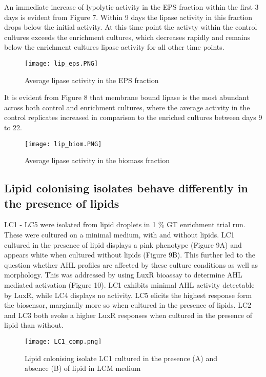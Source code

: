 \documentclass{article}
\begin{document}
An immediate increase of lypolytic activity in the EPS  fraction within the first 3 days is evident from Figure 7. Within 9 days the lipase activity in this fraction drops below the initial activity. At this time point the activty within the control cultures exceeds the enrichment cultures, which decreases rapidly and remains below the enrichment cultures lipase activity for all other time points.

\begin{figure}
\texttt{[image: lip\_eps.PNG]}
\caption{Average lipase activity in the EPS fraction}
\end{figure}

It is evident from  Figure 8 that membrane bound lipase is the most abundant across both control and enrichment cultures, where the average activity in the control replicates increased in comparison to the enriched cultures between days 9 to 22.

\begin{figure}
\texttt{[image: lip\_biom.PNG]}
\caption{Average lipase activity in the biomass fraction}
\end{figure}

\subsection{Lipid colonising isolates behave differently in the presence of lipids}

LC1 - LC5 were isolated from lipid droplets in 1 \% GT enrichment trial run. These were cultured on a minimal medium, with and without lipids. LC1 cultured in the presence of lipid displays a pink phenotype (Figure 9A) and appears white when cultured without lipids (Figure 9B).
This further led to the question whether AHL profiles are affected by these culture conditions as well as morphology. This was addressed by using LuxR bioassay to determine AHL mediated activation (Figure 10). LC1 exhibits minimal AHL activity detectable by LuxR, while LC4 displays no activity. LC5 elicits the highest response form the biosensor, marginally more so when cultured in the presence of lipids. LC2 and LC3 both evoke a higher LuxR responses when cultured in the presence of lipid than without.

\begin{figure}
\texttt{[image: LC1\_comp.png]}
\caption{Lipid colonising isolate LC1 cultured in the presence (A) and absence (B) of lipid in LCM medium}
\end{figure}
\end{document}
